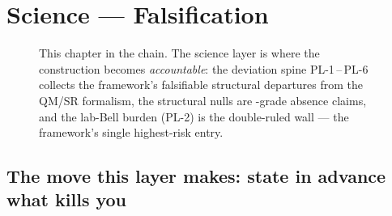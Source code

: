 \chapter{Science --- Falsification}\label{ch:science}


\begin{figure}[t]
  \centering
  \caption[This chapter in the chain]{This chapter in the chain. The science
    layer is where the construction becomes \emph{accountable}: the deviation
    spine PL-1\,--\,PL-6 collects the framework's falsifiable structural
    departures from the QM/SR formalism, the structural nulls are
    -grade absence claims, and the lab-Bell burden (PL-2) is the
    double-ruled wall --- the framework's single highest-risk entry.}
  \label{fig:minimap-science}
\end{figure}

\section*{The move this layer makes: state in advance what kills you}

